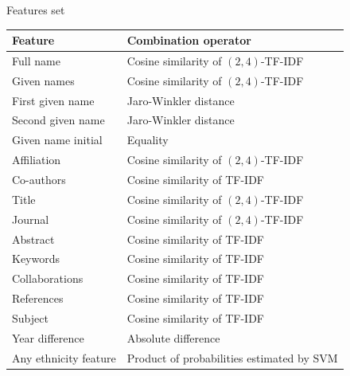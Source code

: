 \documentclass{beamer}
\begin{document}

\begin{frame}{Features set}
\begin{table}
\label{table:features}
\centering
{\small
\begin{tabular}{|l|l|}
  \hline
  \textbf{Feature} & \textbf{Combination operator}\\
  \hline
  \hline
  Full name & Cosine similarity of $(2,4)$-TF-IDF\\
  Given names & Cosine similarity of $(2,4)$-TF-IDF\\
  First given name & Jaro-Winkler distance\\
  Second given name & Jaro-Winkler distance\\
  Given name initial & Equality\\
  Affiliation & Cosine similarity of $(2,4)$-TF-IDF\\
  Co-authors & Cosine similarity of TF-IDF\\
  Title & Cosine similarity of $(2,4)$-TF-IDF\\
  Journal & Cosine similarity of $(2,4)$-TF-IDF\\
  Abstract & Cosine similarity of TF-IDF\\
  Keywords & Cosine similarity of TF-IDF\\
  Collaborations & Cosine similarity of TF-IDF\\
  References & Cosine similarity of TF-IDF\\
  Subject & Cosine similarity of TF-IDF\\
  Year difference & Absolute difference\\
  \hline
  Any ethnicity feature & Product of probabilities estimated by SVM\\
  \hline
\end{tabular}}
\end{table}
\end{frame}




\end{document}
